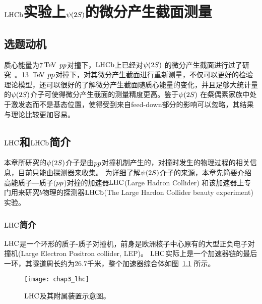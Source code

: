 \chapter{$\mbox{LHCb}$实验上${\psi{(2S)}}$的微分产生截面测量}
\section{选题动机}

质心能量为7$\mathrm{\,Te\kern -0.1em V}$ ${pp}$对撞下，$\mbox{LHCb}$上已经对${\psi{(2S)}}$ 的微分产生截面进行过了研究~\cite{Khachatryan:2015rra}。13 $\mathrm{\,Te\kern -0.1em V}$ ${pp}$对撞下，对其微分产生截面进行重新测量，不仅可以更好的检验理论模型，还可以很好的了解微分产生截面随质心能量的变化，并且足够大统计量的${\psi{(2S)}}$介子可使得微分产生截面的测量精度更高。鉴于${\psi{(2S)}}$ 在粲偶素家族中处于激发态而不是基态位置，使得受到来自feed-down部分的影响可以忽略，其结果与理论比较更加容易。

\section{$\mbox{LHC}$和$\mbox{LHCb}$简介}
\label{sec:lhcb}
本章所研究的${\psi{(2S)}}$介子是由${pp}$对撞机制产生的，对撞时发生的物理过程的相关信息，目前只能由探测器来收集。
为详细了解${\psi{(2S)}}$介子的来源，本章先简要介绍高能质子—质子(${pp}$)对撞的加速器$\mbox{LHC}$(Large Hadron Collider) 和该加速器上专门用来研究$b$物理的探测器$\mbox{LHCb}$(The Large Hardon Collider beauty experiment) 实验。

\subsection{$\mbox{LHC}$简介}
$\mbox{LHC}$是一个环形的质子-质子对撞机，前身是欧洲核子中心原有的大型正负电子对撞机(Large Electron Positron collider, LEP)。
$\mbox{LHC}$实际上是一个加速器链的最后一环，其隧道周长约为26.7千米，整个加速器综合体如图~\ref{fig:lhc} 所示。
\begin{figure}
\begin{center}
\texttt{[image: chap3\_lhc]}
\caption{$\mbox{LHC}$及其附属装置示意图。}
\label{fig:lhc}
\end{center}
\end{figure}

